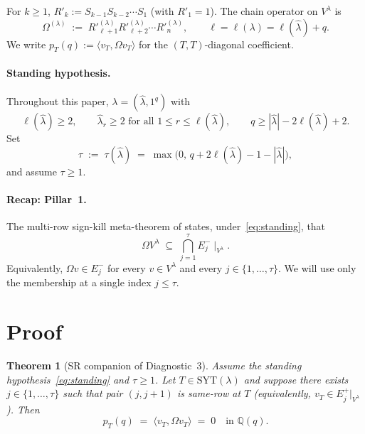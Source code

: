 \documentclass[11pt]{article}
\newtheorem{theorem}{Theorem}
\theoremstyle{definition}
\newcommand{\Vlam}{V^\lambda}
\newcommand{\Om}{\Omega}
\newcommand{\hatl}{\widehat\lambda}
\newcommand{\Rp}{{R'}}
\newcommand{\SYT}{\mathrm{SYT}}
\newcommand{\elh}{\ell(\hatl)}
\newcommand{\Eplus}{E^+}
\newcommand{\Eminus}{E^-}
\newcommand{\pT}{p_T}
\begin{document}
For $k \ge 1$, $\Rp_k := S_{k-1} S_{k-2} \cdots S_1$ (with $\Rp_1 = 1$).
The chain operator on $\Vlam$ is
\[
   \Om^{(\lambda)} \;:=\; \Rp_{\ell+1}^{(\lambda)} \Rp_{\ell+2}^{(\lambda)}
                          \cdots \Rp_n^{(\lambda)},
   \qquad \ell = \ell(\lambda) = \elh + q.
\]
We write $\pT(q) := \langle v_T, \Om v_T \rangle$ for the $(T,T)$-diagonal
coefficient.

\paragraph{Standing hypothesis.} Throughout this paper,
$\lambda = (\hatl, 1^q)$ with
\begin{equation}\label{eq:standing}
   \elh \ge 2,
   \qquad \hatl_r \ge 2 \text{ for all } 1 \le r \le \elh,
   \qquad q \ge |\hatl| - 2\elh + 2.
\end{equation}
Set
\[
   \tau \;:=\; \tau(\hatl) \;=\; \max\bigl(0,\, q + 2\elh - 1 - |\hatl|\bigr),
\]
and assume $\tau \ge 1$.

\paragraph{Recap: Pillar~1.} The multi-row sign-kill meta-theorem of
\cite{pillar1} states, under~\eqref{eq:standing}, that
\begin{equation}\label{eq:pillar1}
   \Om \Vlam \;\subseteq\; \bigcap_{j=1}^{\tau} \Eminus_j \!\mid_{\Vlam}.
\end{equation}
Equivalently, $\Om v \in \Eminus_j$ for every $v \in \Vlam$ and every
$j \in \{1, \ldots, \tau\}$. We will use only the membership at a single
index $j \le \tau$.

\section{Proof}\label{sec:proof}

\begin{theorem}[SR companion of Diagnostic~3]\label{thm:main}
Assume the standing hypothesis~\eqref{eq:standing} and $\tau \ge 1$. Let
$T \in \SYT(\lambda)$ and suppose there exists $j \in \{1, \ldots, \tau\}$
such that pair $(j, j+1)$ is same-row at $T$ (equivalently,
$v_T \in \Eplus_j|_{\Vlam}$). Then
\[
   \pT(q) \;=\; \langle v_T, \Om v_T \rangle \;=\; 0 \quad \text{in } \mathbb{Q}(q).
\]
\end{theorem}
\end{document}
